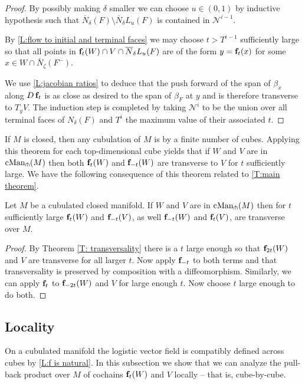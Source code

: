 \begin{proof}
	By possibly making $\delta$ smaller we can choose $u \in (0, 1)$ by inductive hypothesis such that $\overline N_\delta(F) \setminus \overline N_\delta L_u(F)$ is contained in $\mathcal N^{i-1}$.

	By \cref{L:flow to initial and terminal faces} we may choose $t > T^{i-1}$ sufficiently large so that all points in $\mathbf{f}_t(W) \cap V \cap \overline N_\delta L_u(F)$ are of the form $y = \mathbf{f}_t(x)$ for some $x \in W \cap \overline N_\zeta(F^-)$.

	We use \cref{L:jacobian ratios} to deduce that the push forward of the span of $\beta_x$ along $D\,\mathbf{f}_t$ is as close as desired to the span of $\beta_F$ at $y$ and is therefore transverse to $T_y V$.
	The induction step is completed by taking $\mathcal N^i$ to be the union over all terminal faces of $N_\delta(F)$ and $T^i$ the maximum value of their associated $t$.
\end{proof}

If $M$ is closed, then any cubulation of $M$ is by a finite number of cubes.
Applying this theorem for each top-dimensional cube yields that if $W$ and $V$ are in $\mathrm{cMan}_\pitchfork(M)$ then both $\mathbf{f}_t(W)$ and $\mathbf{f}_{-t}(W)$ are transverse to $V$ for $t$ sufficiently large.
We have the following consequence of this theorem related to \cref{T:main theorem}.

\begin{corollary}\label{C:transversality}
	Let $M$ be a cubulated closed manifold.
	If $W$ and $V$ are in $\mathrm{cMan}_\pitchfork(M)$ then for $t$ sufficiently large $\mathbf{f}_t(W)$ and $\mathbf{f}_{-t}(V)$, as well $\mathbf{f}_{-t}(W)$ and $\mathbf{f}_t(V)$, are transverse over $M$.
\end{corollary}

\begin{proof}
	By Theorem \ref{T: transversality} there is a $t$ large enough so that $\mathbf{f}_{2t}(W)$ and $V$ are transverse for all larger $t$.
	Now apply $\mathbf{f}_{-t}$ to both terms and that transversality is preserved by composition with a diffeomorphism.
	Similarly, we can apply $\mathbf{f}_t$ to $\mathbf{f}_{-2t}(W)$ and $V$ for large enough $t$.
	Now choose $t$ large enough to do both.
\end{proof}

\subsection{Locality}

On a cubulated manifold the logistic vector field is compatibly defined across cubes by \cref{L:f is natural}.
In this subsection we show that we can analyze the pull-back product over $M$ of cochains $\mathbf{f}_t(W)$ and $V$ locally -- that is, cube-by-cube.


